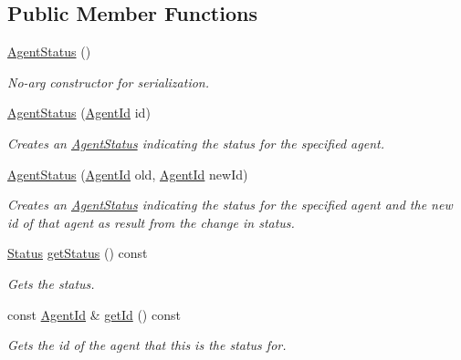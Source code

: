 \subsection*{Public Member Functions}
\begin{DoxyCompactItemize}
\item 
\hypertarget{classrepast_1_1_agent_status_a93ede09e4d9a23cabf104aee32fe8173}{\hyperlink{classrepast_1_1_agent_status_a93ede09e4d9a23cabf104aee32fe8173}{Agent\-Status} ()}\label{classrepast_1_1_agent_status_a93ede09e4d9a23cabf104aee32fe8173}

\begin{DoxyCompactList}\small\item\em No-\/arg constructor for serialization. \end{DoxyCompactList}\item 
\hyperlink{classrepast_1_1_agent_status_a1d03f6ea52fac7810ae1ec022a9a3f63}{Agent\-Status} (\hyperlink{classrepast_1_1_agent_id}{Agent\-Id} id)
\begin{DoxyCompactList}\small\item\em Creates an \hyperlink{classrepast_1_1_agent_status}{Agent\-Status} indicating the status for the specified agent. \end{DoxyCompactList}\item 
\hyperlink{classrepast_1_1_agent_status_af05d4fd8798e721224f8f5f1ed39dced}{Agent\-Status} (\hyperlink{classrepast_1_1_agent_id}{Agent\-Id} old, \hyperlink{classrepast_1_1_agent_id}{Agent\-Id} new\-Id)
\begin{DoxyCompactList}\small\item\em Creates an \hyperlink{classrepast_1_1_agent_status}{Agent\-Status} indicating the status for the specified agent and the new id of that agent as result from the change in status. \end{DoxyCompactList}\item 
\hyperlink{classrepast_1_1_agent_status_ab0ec44d1ec040df129f324d0014a743c}{Status} \hyperlink{classrepast_1_1_agent_status_af1a1d334b69e53bdf0d2eb6f36358a15}{get\-Status} () const 
\begin{DoxyCompactList}\small\item\em Gets the status. \end{DoxyCompactList}\item 
const \hyperlink{classrepast_1_1_agent_id}{Agent\-Id} \& \hyperlink{classrepast_1_1_agent_status_af4fd9fa19b3197ac357723c3e6239a38}{get\-Id} () const 
\begin{DoxyCompactList}\small\item\em Gets the id of the agent that this is the status for. \end{DoxyCompactList}\item 

\end{DoxyCompactItemize}
